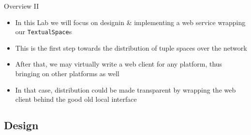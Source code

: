 \documentclass[presentation]{beamer}\mode<presentation>{\usetheme{AMSCesenaPurpleAndGold}}
\begin{document}
\begin{frame}{Overview II}
    \begin{itemize}
        \item In this Lab we will focus on designin \& implementing a \alert{web service} wrapping our \texttt{TextualSpace}s
        
        \vfill
        
        \item This is the first step towards the \alert{distribution} of \linda{} tuple spaces over the network
        
        \vfill
        
        \item After that, we may virtually write a \alert{web client} for any platform, thus bringing \linda{} on other platforms as well
        
        \vfill
        
        \item In that case, distribution could be made \alert{transparent} by wrapping the web client behind the good old local interface
    \end{itemize}
\end{frame}

\subsection{Design}
\end{document}

